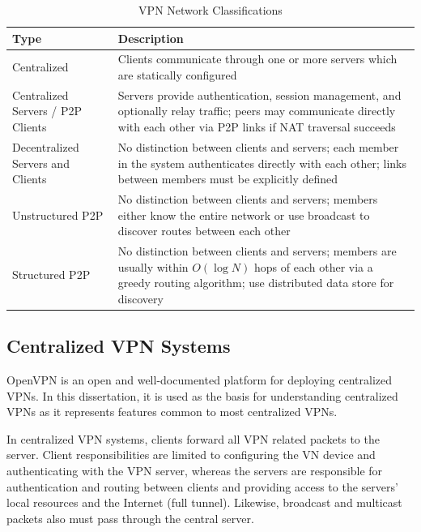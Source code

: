 \begin{center}
\begin{table}
\caption{VPN Network Classifications}
\label{tab:vpn_types}
\begin{tabular}{p{1.5in}p{4.5in}} \hline
Type & Description \\ \hline \hline
Centralized & Clients communicate through one or more servers which are statically
configured \\ \hline
Centralized Servers / P2P Clients & Servers provide authentication, session management, and
optionally relay traffic; peers may communicate directly with each
other via P2P links if NAT traversal succeeds\\ \hline
Decentralized Servers and Clients & No distinction between clients and servers;
each member in the system authenticates directly with each other; links between
members must be explicitly defined \\ \hline
Unstructured P2P & No distinction between clients and servers; members either know
the entire network or use broadcast to discover routes between each other \\ \hline
Structured P2P & No distinction between clients and servers; members are usually
within $O(\log N)$ hops of each other via a greedy routing algorithm; use
distributed data store for discovery \\ \hline
\end{tabular}
\end{table}
\end{center}


\subsection{Centralized VPN Systems}

OpenVPN is an open and well-documented platform for deploying centralized VPNs.
In this dissertation, it is used as the basis for understanding centralized
VPNs as it represents features common to most centralized VPNs.

In centralized VPN systems, clients forward all VPN related packets to the
server.  Client responsibilities are limited to configuring the VN device and
authenticating with the VPN server, whereas the servers are responsible for
authentication and routing between clients and providing access to the servers'
local resources and the Internet (full tunnel).  Likewise, broadcast and
multicast packets also must pass through the central server.


